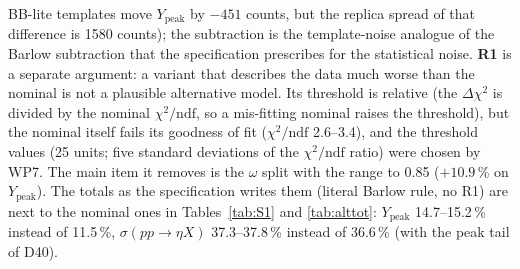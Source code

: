 \documentclass[11pt,a4paper]{article}
\newcommand{\Ypeak}{\ensuremath{Y_{\mathrm{peak}}}\xspace}
\newcommand{\sigeta}{\ensuremath{\sigma(pp\to\eta X)}\xspace}
\begin{document}
BB-lite templates move \Ypeak by $-451$ counts, but the replica spread of that difference is 1580 counts); the subtraction is the template-noise
analogue of the Barlow subtraction that the specification prescribes for the statistical noise. \textbf{R1} is a separate argument: a
variant that describes the data much worse than the nominal is not a plausible alternative model. Its threshold is relative (the
$\Delta\chi^2$ is divided by the nominal $\chi^2/\mathrm{ndf}$, so a mis-fitting nominal raises the threshold), but the nominal itself fails its
goodness of fit ($\chi^2/\mathrm{ndf}$ 2.6--3.4), and the threshold values (25 units; five standard deviations of the $\chi^2/\mathrm{ndf}$ ratio)
were chosen by WP7. The main item it removes is the $\omega$ split with the range to 0.85 ($+10.9$\,\% on \Ypeak). The totals as the
specification writes them (literal Barlow rule, no R1) are next to the nominal ones in Tables~\ref{tab:S1} and \ref{tab:alttot}: \Ypeak
14.7--15.2\,\% instead of 11.5\,\%, \sigeta 37.3--37.8\,\% instead of 36.6\,\% (with the peak tail of D40).
\end{document}
